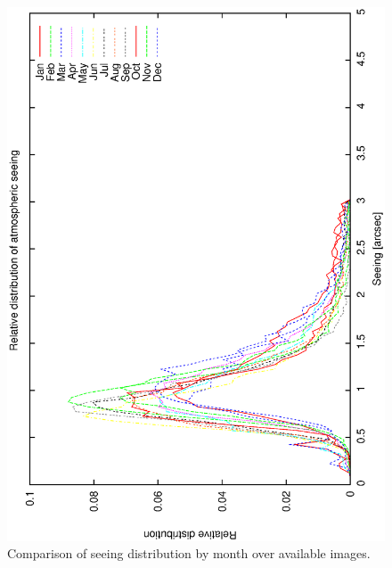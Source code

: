 {{\begin{figure}[htbp]
\begin{center}
    \includegraphics[scale=0.4, angle=-90]{figures/ecs/corr_see_dist_all.eps}
\end{center} 
\caption[Comparison of seeing distribution by month over available images.]
{Comparison of seeing distribution by month over available images.}
\label{fig:see_dist_all}
\end{figure}


}}
